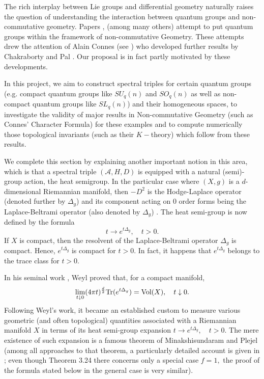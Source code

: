 \documentclass[12pt]{article}
\begin{document}
The rich interplay between Lie groups and differential geometry naturally raises the question of understanding the interaction between quantum groups and non-commutative geometry. Papers \cite{ChakrabortyPal}, \cite{NeshTus} (among many others) attempt to put quantum groups within the framework of non-commutative Geometry. These attempts drew the attention of Alain Connes (see \cite{Connes-suq2}) who developed further results by Chakraborty and Pal \cite{ChakrabortyPal}. Our proposal is in fact partly motivated by these developments.

In this project, we aim to construct spectral triples for certain quantum groups (e.g. compact quantum groups like $SU_q(n)$ and $SO_q(n)$ as well as non-compact quantum groups like $SL_q(n)$) and their homogeneous spaces, to investigate the validity of major results in Non-commutative Geometry (such as Connes' Character Formula) for these examples and to compute numerically those topological invariants (such as their $K-$theory) which follow from these results.

We complete this section by explaining another important notion in this area, which is that a spectral triple $(\mathcal{A},H,D)$ is equipped with a natural (semi)-group action, the heat semigroup. In the particular case where $(X,g)$ is a $d$-dimensional Riemannian manifold, then $-D^2$ is the Hodge-Laplace operator (denoted further by $\Delta_g$) and its component acting on $0$ order forms being the Laplace-Beltrami operator (also denoted by $\Delta_g$) \cite{Rosenberg}. The heat semi-group is now defined by the formula
$$t\to e^{t\Delta_g},\quad t>0.$$
If $X$ is compact, then the resolvent of the Laplace-Beltrami operator $\Delta_g$ is compact. Hence, $e^{t\Delta_g}$ is compact for $t>0.$ In fact, it happens that $e^{t\Delta_g}$ belongs to the trace class for $t>0.$

In his seminal work \cite{Weyl}, Weyl proved that, for a compact manifold,
\begin{equation}\label{weyl formula}
\lim_{t\downarrow0}(4\pi t)^{\frac{d}{2}}{\rm Tr}(e^{t\Delta_g})={\rm Vol}(X),\quad t\downarrow0.
\end{equation}
Following Weyl's work, it became an established custom to measure various geometric (and often topological) quantities associated with a Riemannian manifold $X$ in terms of its heat semi-group expansion $t\to e^{t\Delta_g},\quad t>0.$ The mere existence of such expansion is a famous theorem of Minakshisundaram and Plejel (among all approaches to that theorem, a particularly detailed account is given in \cite{Rosenberg}; even though Theorem 3.24 there concerns only a special case $f=1,$ the proof of the formula stated below in the general case is very similar). 
\end{document}
